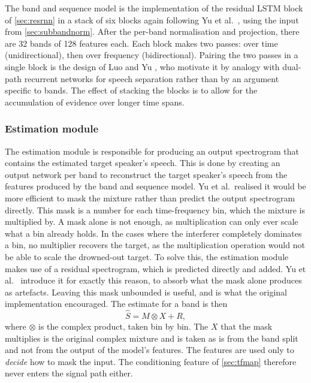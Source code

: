 The band and sequence model is the implementation of the residual LSTM block of \autoref{sec:resrnn} in a stack of six blocks again following Yu et al.\ \cite{yu2023high}, using the input from \autoref{sec:subbandnorm}. After the per-band normalisation and projection, there are 32 bands of 128 features each. Each block makes two passes: over time (unidirectional), then over frequency (bidirectional). Pairing the two passes in a single block is the design of Luo and Yu \cite{luo2023music}, who motivate it by analogy with dual-path recurrent networks for speech separation rather than by an argument specific to bands. The effect of stacking the blocks is to allow for the accumulation of evidence over longer time spans.

\subsubsection{Estimation module}
\label{sec:estimator}

The estimation module is responsible for producing an output spectrogram that contains the estimated target speaker's speech. This is done by creating an output network per band to reconstruct the target speaker's speech from the features produced by the band and sequence model. Yu et al.\ realised it would be more efficient to mask the mixture rather than predict the output spectrogram directly. This mask is a number for each time-frequency bin, which the mixture is multiplied by. A mask alone is not enough, as multiplication can only ever scale what a bin already holds. In the cases where the interferer completely dominates a bin, no multiplier recovers the target, as the multiplication operation would not be able to scale the drowned-out target. To solve this, the estimation module makes use of a residual spectrogram, which is predicted directly and added. Yu et al.\ \cite{yu2023high} introduce it for exactly this reason, to absorb what the mask alone produces as artefacts. Leaving this mask unbounded is useful, and is what the original implementation encouraged. The estimate for a band is then
\begin{equation}
\hat{S} = M \otimes X + R,
\label{eq:estimator}
\end{equation}
where $\otimes$ is the complex product, taken bin by bin. The $X$ that the mask multiplies is the original complex mixture and is taken as is from the band split and not from the output of the model's features. The features are used only to \emph{decide} how to mask the input. The conditioning feature of \autoref{sec:tfmap} therefore never enters the signal path either.


